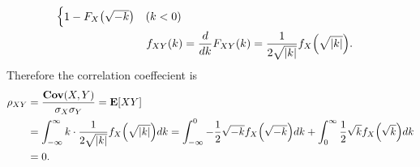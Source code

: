 \documentclass{article}
\begin{document}
\begin{enumerate}[(a)]
\begin{align*}
\begin{cases}
            1 - F_{X}\qty(\sqrt{-k}) & (k < 0)
        \end{cases} \\
        f_{XY}(k) &= \frac{d}{dk}F_{XY}(k) = \frac{1}{2\sqrt{|k|}}f_{X}\qty(\sqrt{|k|}).
    \end{align*}
    Therefore the correlation coeffecient is
    \begin{align*}
        \rho_{XY} &= \frac{\mathbf{Cov}\qty(X, Y)}{\sigma_X\sigma_Y} = \mathbf{E}\qty[XY] \\
        &= \int_{-\infty}^{\infty}k\cdot\frac{1}{2\sqrt{|k|}}f_{X}\qty(\sqrt{|k|})dk = \int_{-\infty}^{0}-\frac{1}{2}\sqrt{-k}f_{X}\qty(\sqrt{-k})dk + \int_{0}^{\infty}\frac{1}{2}\sqrt{k}f_{X}\qty(\sqrt{k})dk \\
        &= 0.
    \end{align*}
\end{enumerate}
\end{document}
